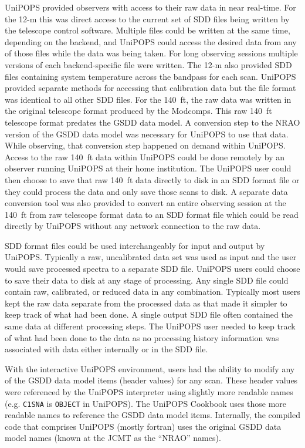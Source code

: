 \documentclass[final,authoryear,5p,times,twocolumn]{elsarticle}
\begin{document}
UniPOPS provided observers with access to their raw data in near
real-time.  For the 12-m this was direct access to the current set of
SDD files being written by the telescope control software.  Multiple
files could be written at the same time, depending on the backend, and
UniPOPS could access the desired data from any of those files
while the data was being taken.  For long observing sessions multiple
versions of each backend-specific file were written. The 12-m also provided
SDD files containing system temperature across the bandpass for each
scan.  UniPOPS provided separate methods for accessing that calibration
data but the file format was identical to all other SDD files.  For
the 140\, ft, the raw data was written in the original telescope
format produced by the Modcomps.  This raw 140\, ft telescope format
predates the GSDD data model.  A conversion step to the NRAO version of
the GSDD data model was necessary for UniPOPS to use that data.
While observing, that conversion step happened on demand within UniPOPS.
Access to the raw 140\, ft data within UniPOPS could be done remotely
by an observer running UniPOPS at their home institution.  The
UniPOPS user could then choose to save that raw 140\, ft data directly
to disk in an SDD format file or they could process the data and only
save those scans to disk.  A separate data conversion tool was also
provided to convert an entire observing session at the 140\, ft from
raw telescope format data to an SDD format file which could be
read directly by UniPOPS without any network connection to the
raw data.

SDD format files could be used interchangeably for input and output by
UniPOPS.  Typically a raw, uncalibrated data set was used as input and
the user would save processed spectra to a separate SDD file.  UniPOPS
users could choose to save their data to disk at any stage of processing.
Any single SDD file could contain raw, calibrated, or reduced data in
any combination.  Typically most users kept the raw data separate from
the processed data as that made it simpler to keep track of what
had been done. A single output SDD file often contained the same data
at different processing steps.  The UniPOPS user needed to keep track
of what had been done to the data as no processing history information
was associated with data either internally or in the SDD file.

With the interactive UniPOPS environment, users had the ability to modify
any of the GSDD data model items (header values) for any scan.  These
header values were referenced by the UniPOPS interpreter using slightly
more readable names (e.g. \texttt{C1SNA} is \texttt{OBJECT}
in UniPOPS). The UniPOPS Cookbook \citep[]{UNIPOPS} uses those more
readable names to reference the GSDD data model items.  Internally,
the compiled code that comprises UniPOPS (mostly fortran) uses the
original GSDD data model names (known at the JCMT as the ``NRAO'' names).
\end{document}
